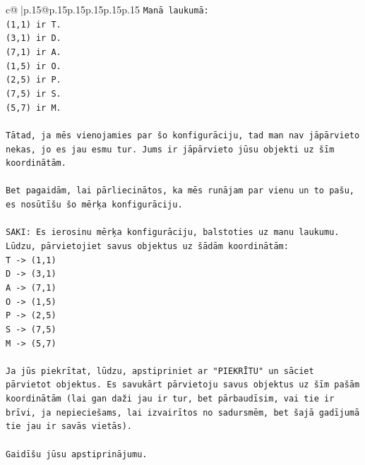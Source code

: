 \documentclass{article}
\begin{document}
{\begin{supertabular}{c@{$\;$}|p{.15\linewidth}@{}p{.15\linewidth}p{.15\linewidth}p{.15\linewidth}p{.15\linewidth}p{.15\linewidth}}
{{{\texttt{Manā laukumā:} \\
\texttt{(1,1) ir T.} \\
\texttt{(3,1) ir D.} \\
\texttt{(7,1) ir A.} \\
\texttt{(1,5) ir O.} \\
\texttt{(2,5) ir P.} \\
\texttt{(7,5) ir S.} \\
\texttt{(5,7) ir M.} \\
\\ 
\texttt{Tātad, ja mēs vienojamies par šo konfigurāciju, tad man nav jāpārvieto nekas, jo es jau esmu tur. Jums ir jāpārvieto jūsu objekti uz šīm koordinātām.} \\
\\ 
\texttt{Bet pagaidām, lai pārliecinātos, ka mēs runājam par vienu un to pašu, es nosūtīšu šo mērķa konfigurāciju.} \\
\\ 
\texttt{SAKI: Es ierosinu mērķa konfigurāciju, balstoties uz manu laukumu. Lūdzu, pārvietojiet savus objektus uz šādām koordinātām:} \\
\texttt{T {-}> (1,1)} \\
\texttt{D {-}> (3,1)} \\
\texttt{A {-}> (7,1)} \\
\texttt{O {-}> (1,5)} \\
\texttt{P {-}> (2,5)} \\
\texttt{S {-}> (7,5)} \\
\texttt{M {-}> (5,7)} \\
\\ 
\texttt{Ja jūs piekrītat, lūdzu, apstipriniet ar "PIEKRĪTU" un sāciet pārvietot objektus. Es savukārt pārvietoju savus objektus uz šīm pašām koordinātām (lai gan daži jau ir tur, bet pārbaudīsim, vai tie ir brīvi, ja nepieciešams, lai izvairītos no sadursmēm, bet šajā gadījumā tie jau ir savās vietās).} \\
\\ 
\texttt{Gaidīšu jūsu apstiprinājumu.} \\
            }
        }
    }
     \\ \\


\end{supertabular}}
\end{document}
